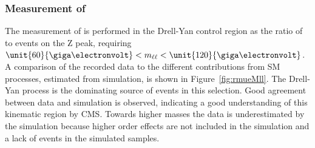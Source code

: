 \subsubsection{Measurement of \rmue}
The measurement of \rmue is performed in the Drell-Yan control region as the ratio of \MM to \EE events on the Z peak, requiring $\unit{60}{\giga\electronvolt} < \mll < \unit{120}{\giga\electronvolt}$. A comparison of the recorded data to the different contributions  from SM processes, estimated from simulation, is shown in Figure~\ref{fig:rmueMll}. The Drell-Yan process is the dominating source of events in this selection. Good agreement between data and simulation is observed, indicating a good understanding of this kinematic region by CMS. Towards higher masses the data is underestimated by the simulation because higher order effects are not included in the simulation and a lack of events in the simulated samples.  
